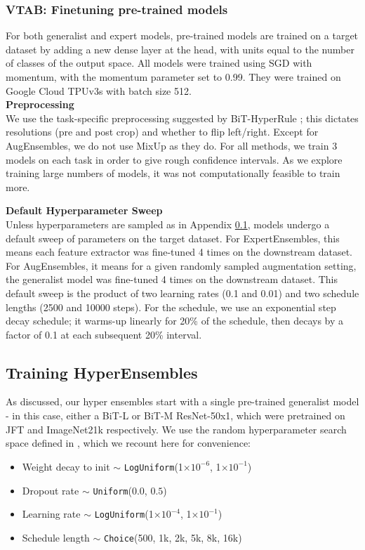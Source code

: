 \documentclass{article} \usepackage{iclr2021_conference,times}
\newcommand{\e}[1]{$\times 10^{#1}$}
\begin{document}
\subsubsection{VTAB: Finetuning pre-trained models}
\label{app:finetuning}
For both generalist and expert models, pre-trained models are trained on a target dataset by adding a new dense layer at the head, with units equal to the number of classes of the output space. All models were trained using SGD with momentum, with the momentum parameter set to 0.99. They were trained on Google Cloud TPUv3s with batch size 512.\\

\textbf{Preprocessing}\\
We use the task-specific preprocessing suggested by BiT-HyperRule \citep{alex2019big}; this dictates resolutions (pre and post crop) and whether to flip left/right. Except for AugEnsembles, we do not use MixUp as they do. For all methods, we train 3 models on each task in order to give rough confidence intervals. As we explore training large numbers of models, it was not computationally feasible to train more.

\textbf{Default Hyperparameter Sweep}\\
Unless hyperparameters are sampled as in Appendix \ref{app:training_hes}, models undergo a default sweep of parameters on the target dataset. For ExpertEnsembles, this means each feature extractor was fine-tuned 4 times on the downstream dataset. For AugEnsembles, it means for a given randomly sampled augmentation setting, the generalist model was fine-tuned 4 times on the downstream dataset. This default sweep is the product of two learning rates (0.1 and 0.01) and two schedule lengths (2500 and 10000 steps). For the schedule, we use an exponential step decay schedule; it warms-up linearly for 20\% of the schedule, then decays by a factor of 0.1 at each subsequent 20\% interval.

\subsection{Training HyperEnsembles}
\label{app:training_hes}
As discussed, our hyper ensembles start with a single pre-trained generalist model - in this case, either a BiT-L or BiT-M ResNet-50x1, which were pretrained on JFT and ImageNet21k respectively. We use the random hyperparameter search space defined in \cite{alex2019big}, which we recount here for convenience:
\begin{itemize}
    \item Weight decay to init $\sim$ \texttt{LogUniform}(1\e{-6}, 1\e{-1})
    \item Dropout rate $\sim$  \texttt{Uniform}($0.0$, $0.5$)
    \item Learning rate $\sim$ \texttt{LogUniform}(1\e{-4}, 1\e{-1})
    \item Schedule length $\sim$ \texttt{Choice}(500, 1k, 2k, 5k, 8k, 16k)
\end{itemize}
\end{document}
